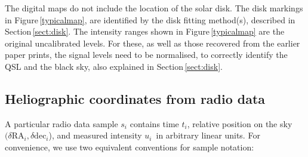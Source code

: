 \documentclass{aa}
\begin{document}
  The digital maps do not include the location of the solar disk.
  The disk markings in Figure\,\ref{typicalmap}, are identified by the 
  disk fitting method(s), described in Section\,\ref{sect:disk}.
  The intensity ranges shown in Figure\,\ref{typicalmap} are the original
  uncalibrated levels.
  For these, as well as those recovered from the earlier paper prints, the 
  signal levels need to be normalised, to correctly identify the QSL and the
  black sky, also explained in Section\,\ref{sect:disk}.



\subsection{Heliographic coordinates from radio data}

A particular radio data sample $s_i$ contains time $t_i$, relative position on the sky $(\delta \mathrm{RA}_i, \delta 
\mathrm{dec}_i$), and measured intensity $u_i$ in arbitrary linear units. For convenience, we use two equivalent 
conventions for sample notation:
\end{document}
